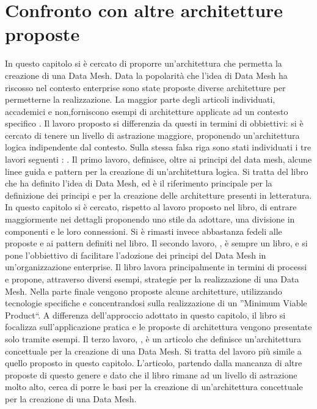 \documentclass[12pt]{report}
\begin{document}
\section{Confronto con altre architetture proposte}
In questo capitolo si è cercato di proporre un'architettura che permetta la creazione di una Data Mesh. 
Data la popolarità che l'idea di Data Mesh ha riscosso nel contesto enterprise sono state proposte diverse architetture per permetterne la realizzazione.
La maggior parte degli articoli individuati, accademici e non,forniscono esempi di architetture applicate ad un contesto specifico \cite{falconi2023adopting,pakrashi2023cowmesh,joshi_data_2021,blog_data_2022}.
Il lavoro proposto si differenzia da questi in termini di obbiettivi: si è cercato di tenere un livello di astrazione maggiore, proponendo un'architettura logica indipendente dal contesto. 
Sulla stessa falsa riga sono stati individuati i tre lavori seguenti : \cite{dehghani_data_2022, majchrzak2023data,machado2021data}.
Il primo lavoro, \cite{dehghani_data_2022} definisce, oltre ai principi del data mesh, alcune linee guida e pattern per la creazione di un'architettura logica.
Si tratta del libro che ha definito l'idea di Data Mesh, ed è il riferimento principale per la definizione dei principi e per la creazione delle architetture presenti in letteratura.
In questo capitolo si è cercato, rispetto al lavoro proposto nel libro, di entrare maggiormente nei dettagli proponendo uno stile da adottare, una divisione in componenti e le loro connessioni.
Si è rimasti invece abbastanza fedeli alle proposte e ai pattern definiti nel libro.
Il secondo lavoro, \cite{majchrzak2023data}, è sempre un libro, e si pone l'obbiettivo di facilitare l'adozione dei principi del Data Mesh in un'organizzazione enterprise.
Il libro lavora principalmente in termini di processi e propone, attraverso diversi esempi, strategie per la realizzazione di una Data Mesh.
Nella parte finale vengono proposte alcune architetture, utilizzando tecnologie specifiche e concentrandosi sulla realizzazione di un ''Minimum Viable Product``.
A differenza dell'approccio adottato in questo capitolo, il libro si focalizza sull'applicazione pratica e le proposte di architettura vengono presentate solo tramite esempi.
Il terzo lavoro, \cite{machado2021data}, è un articolo che definisce un'architettura concettuale per la creazione di una Data Mesh.
Si tratta del lavoro più simile a quello proposto in questo capitolo.
L'articolo, partendo dalla mancanza di altre proposte di questo genere e dato che il libro \cite{dehghani_data_2022} rimane ad un livello di astrazione molto alto, cerca di porre le basi per la creazione di un'architettura concettuale per la creazione di una Data Mesh.
\end{document}
